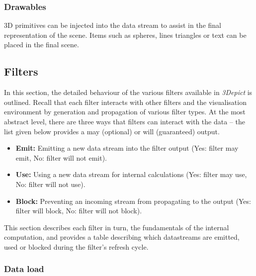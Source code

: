 \documentclass[10pt]{article}
\begin{document}
\subsubsection{Drawables}
3D primitives can be injected into the data stream to assist in the final representation of the scene. Items such as spheres, lines triangles or text can be placed in the final scene.
 

\subsection{Filters}

In this section, the detailed behaviour of the various filters available in \emph{3Depict} is outlined. Recall that each filter interacts with other filters and the visualisation environment by generation and propagation of various filter types. At the most abstract level, there are three ways that filters can interact with the data -- the list given below provides a may (optional) or will (guaranteed) output.

\begin{itemize}
 \item \textbf{Emit:} Emitting a new data stream into the filter output (Yes: filter may emit, No: filter will not emit).
 \item \textbf{Use:} Using a new data stream for internal calculations (Yes: filter may use, No: filter will not use). 
 \item \textbf{Block:} Preventing an incoming stream from propagating to the output (Yes: filter will block, No: filter will not block).
\end{itemize} 

This section describes each filter in turn, the fundamentals of the internal computation, and provides a table describing which datastreams are emitted, used or blocked during the filter's refresh cycle.

\label{sec:filter} 
\subsubsection{Data load}
 
\end{document}

